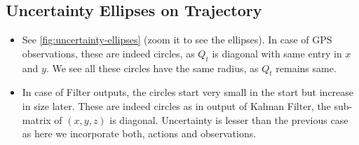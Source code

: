     
\subsection{Uncertainty Ellipses on Trajectory}
\begin{itemize}
    \item See \autoref{fig:uncertainty-ellipses} (zoom it to see the ellipses). In case of GPS observations, these are indeed circles, as $Q_t$ is diagonal with same entry in $x$ and $y$. We see all these circles have the same radius, as $Q_t$ remains same.

    \item In case of Filter outputs, the circles start very small in the start but increase in size later. These are indeed circles as in output of Kalman Filter, the sub-matrix of $(x, y, z)$ is diagonal. Uncertainty is lesser than the previous case as here we incorporate both, actions and observations.
\end{itemize}
